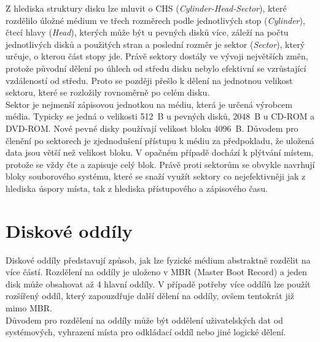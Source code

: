 Z hlediska struktury disku lze mluvit o CHS (\textit{Cylinder-Head-Sector}), které rozdělilo úložné médium ve třech rozměrech podle jednotlivých stop (\textit{Cylinder}), čtecí hlavy (\textit{Head}), kterých může být u pevných disků více, záleží na počtu jednotlivých disků a použitých stran a poslední rozměr je sektor (\textit{Sector}), který určuje, o kterou část stopy jde. Právě sektory dostály ve vývoji největších změn, protože původní dělení po úhlech od středu disku nebylo efektivní se vzrůstající vzdáleností od středu. Proto se později přešlo k dělení na jednotnou velikost sektoru, které se rozložily rovnoměrně po celém disku.\\
Sektor je nejmenší zápisovou jednotkou na médiu, která je určená výrobcem média. Typicky se jedná o velikosti 512~B u pevných disků, 2048~B u CD-ROM a DVD-ROM. Nové pevné disky používají velikost bloku 4096~B. Důvodem pro členění po sektorech je zjednodušení přístupu k médiu za předpokladu, že uložená data jsou větší než velikost bloku. V opačném případě dochází k plýtvání místem, protože se vždy čte a zapisuje celý blok. Právě proti sektorům se obvykle navrhují bloky souborového systému, které se snaží využít sektory co nejefektivněji jak z hlediska úspory místa, tak z hlediska přístupového a zápisového času.

\section{Diskové oddíly}
Diskové oddíly představují způsob, jak lze fyzické médium abstraktně rozdělit na více částí. Rozdělení na oddíly je uloženo v MBR (Master Boot Record) a jeden disk může obsahovat až 4 hlavní oddíly. V případě potřeby více oddílů lze použít rozšířený oddíl, který zapouzdřuje další dělení na oddíly, ovšem tentokrát již mimo MBR.\\
Důvodem pro rozdělení na oddíly může být oddělení uživatelských dat od systémových, vyhrazení místa pro odkládací oddíl nebo jiné logické dělení. 

